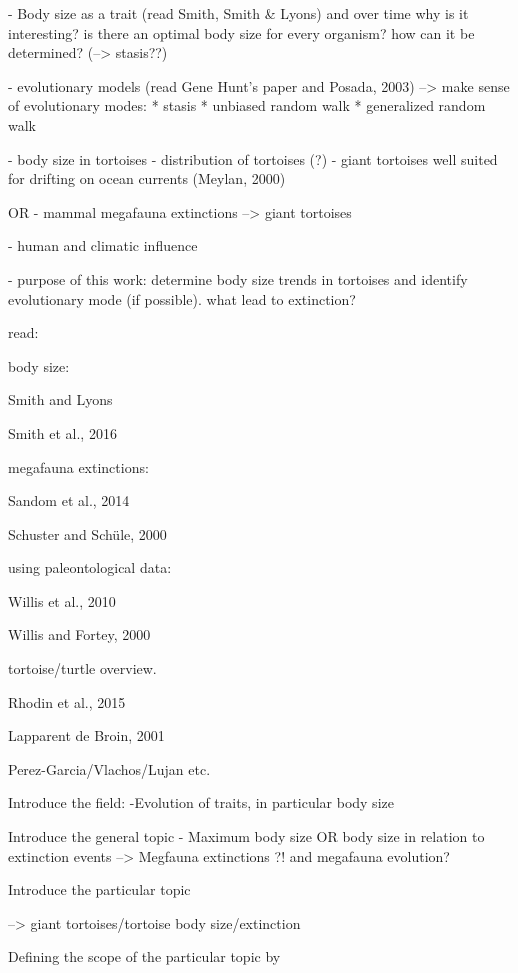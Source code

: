
- Body size as a trait (read Smith, Smith \& Lyons) and over time
why is it interesting?
is there an optimal body size for every organism? how can it be determined? (--> stasis??)

- evolutionary models (read Gene Hunt's paper and Posada, 2003)
-->  make sense of evolutionary modes:
* stasis
* unbiased random walk
* generalized random walk


- body size in tortoises %
- distribution of tortoises (?)
- giant tortoises well suited for drifting on ocean currents (Meylan, 2000)

OR
- mammal megafauna extinctions --> giant tortoises

- human and climatic influence

- purpose of this work: determine body size trends in tortoises and identify evolutionary mode (if possible). what lead to extinction?




read:

body size:

Smith and Lyons

Smith et al., 2016

megafauna extinctions:

Sandom et al., 2014

Schuster and Schüle, 2000

using paleontological data:

Willis et al., 2010

Willis and Fortey, 2000

tortoise/turtle overview.

Rhodin et al., 2015

Lapparent de Broin, 2001

Perez-Garcia/Vlachos/Lujan etc.


Introduce the field:
-Evolution of traits, in particular body size

Introduce the general topic
- Maximum body size OR body size in relation to extinction events
--> Megfauna extinctions ?! and megafauna evolution?

Introduce the particular topic

--> giant tortoises/tortoise body size/extinction

Defining the scope of the particular topic by

